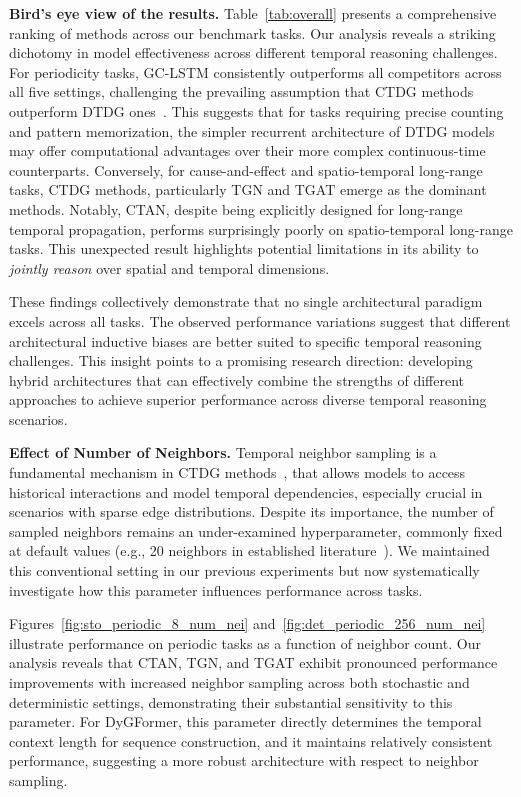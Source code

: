\textbf{Bird's eye view of the results.} Table~\ref{tab:overall} presents a comprehensive ranking of methods across our benchmark tasks. 
Our analysis reveals a striking dichotomy in model effectiveness across different temporal reasoning challenges. For periodicity tasks, GC-LSTM consistently outperforms all competitors across all five settings, challenging the prevailing assumption that CTDG methods outperform DTDG ones~\cite{huangutg}. This suggests that for tasks requiring precise counting and pattern memorization, the simpler recurrent architecture of DTDG models may offer computational advantages over their more complex continuous-time counterparts. Conversely, for cause-and-effect and spatio-temporal long-range tasks, CTDG methods, particularly TGN and TGAT emerge as the dominant methods. Notably, CTAN, despite being explicitly designed for long-range temporal propagation, performs surprisingly poorly on spatio-temporal long-range tasks. This unexpected result highlights potential limitations in its ability to \textit{jointly reason} over spatial and temporal dimensions.

 These findings collectively demonstrate that no single architectural paradigm excels across all \benchmarkname tasks. The observed performance variations suggest that different architectural inductive biases are better suited to specific temporal reasoning challenges. This insight points to a promising research direction: developing hybrid architectures that can effectively combine the strengths of different approaches to achieve superior performance across diverse temporal reasoning scenarios.

 \textbf{Effect of Number of Neighbors.} Temporal neighbor sampling is a fundamental mechanism in CTDG methods~\cite{dygformer,tgn,tgat,luo2022neighborhood}, that allows  models to access historical interactions and model temporal dependencies, especially crucial in scenarios with sparse edge distributions. Despite its importance, the number of sampled neighbors remains an under-examined hyperparameter, commonly fixed at default values (e.g., 20 neighbors in established literature~\cite{dygformer}). We maintained this conventional setting in our previous experiments but now systematically investigate how this parameter influences performance across \benchmarkname tasks.

 Figures~\ref{fig:sto_periodic_8_num_nei} and~\ref{fig:det_periodic_256_num_nei} illustrate performance on periodic tasks as a function of neighbor count. Our analysis reveals that CTAN, TGN, and TGAT exhibit pronounced performance improvements with increased neighbor sampling across both stochastic and deterministic settings, demonstrating their substantial sensitivity to this parameter. For DyGFormer, this parameter directly determines the temporal context length for sequence construction, and it maintains relatively consistent performance, suggesting a more robust architecture with respect to neighbor sampling. 


